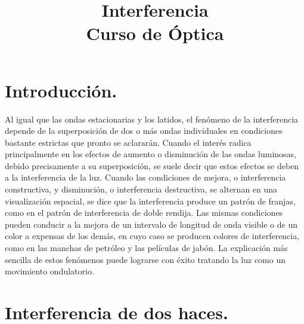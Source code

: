 \documentclass[14pt]{extarticle}
\title{\vspace*{-2cm} Interferencia \\ Curso de Óptica \vspace{-3ex}}
\date{ }
\begin{document}
\maketitle
\vspace*{-2cm}

\section{Introducción.}

Al igual que las ondas estacionarias y los latidos, el fenómeno de la interferencia depende de la superposición de dos o más ondas individuales en condiciones bastante estrictas que pronto se aclararán. Cuando el interés radica principalmente en los efectos de aumento o disminución de las ondas luminosas, debido precisamente a su superposición, se suele decir que estos efectos se deben a la interferencia de la luz. Cuando las condiciones de mejora, o interferencia constructiva, y disminución, o interferencia destructiva, se alternan en una visualización espacial, se dice que la interferencia produce un patrón de franjas, como en el patrón de interferencia de doble rendija. Las mismas condiciones pueden conducir a la mejora de un intervalo de longitud de onda visible o de un color a expensas de los demás, en cuyo caso se producen colores de interferencia, como en las manchas de petróleo y las películas de jabón. La explicación más sencilla de estos fenómenos puede lograrse con éxito tratando la luz como un movimiento ondulatorio. %

\section{Interferencia de dos haces.}
\end{document}
